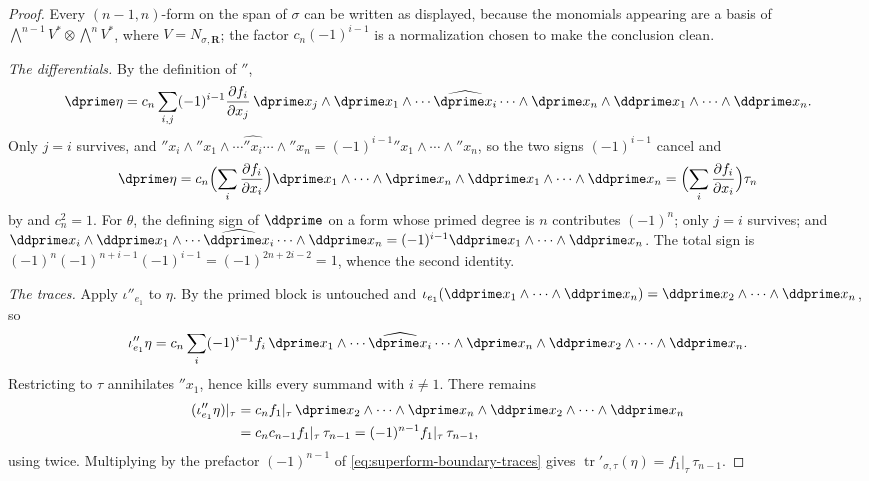 \begin{proof}
Every $(n-1,n)$-form on the span of $\sigma$ can be written as displayed,
because the monomials appearing are a basis of
$\bigwedge^{n-1}V^*\otimes\bigwedge^nV^*$, where
$V=N_{\sigma,\mathbf R}$; the factor
$c_n(-1)^{i-1}$ is a normalization chosen to make the conclusion clean.

\emph{The differentials.}  By the definition of $\dprime$,
\[
 \dprime\eta
 =c_n\sum_{i,j}(-1)^{i-1}\frac{\partial f_i}{\partial x_j}\,
   \dprime x_j\wedge\dprime x_1\wedge\cdots\widehat{\dprime x_i}\cdots
   \wedge\dprime x_n\wedge\ddprime x_1\wedge\cdots\wedge\ddprime x_n .
\]
Only $j=i$ survives, and
$\dprime x_i\wedge\dprime x_1\wedge\cdots\widehat{\dprime x_i}\cdots
\wedge\dprime x_n=(-1)^{i-1}\dprime x_1\wedge\cdots\wedge\dprime x_n$, so
the two signs $(-1)^{i-1}$ cancel and
\[
 \dprime\eta=c_n\Bigl(\sum_i\frac{\partial f_i}{\partial x_i}\Bigr)
  \dprime x_1\wedge\cdots\wedge\dprime x_n
   \wedge\ddprime x_1\wedge\cdots\wedge\ddprime x_n
  =\Bigl(\sum_i\frac{\partial f_i}{\partial x_i}\Bigr)\tau_n
\]
by  and $c_n^2=1$.  For $\theta$, the
defining sign of $\ddprime$ on a form whose primed degree is $n$ contributes
$(-1)^n$; only $j=i$ survives; and
$\ddprime x_i\wedge\ddprime x_1\wedge\cdots\widehat{\ddprime x_i}\cdots
\wedge\ddprime x_n=(-1)^{i-1}\ddprime x_1\wedge\cdots\wedge\ddprime x_n$.
The total sign is
$(-1)^n(-1)^{n+i-1}(-1)^{i-1}=(-1)^{2n+2i-2}=1$, whence the second identity.

\emph{The traces.}  Apply $\iota''_{e_1}$ to $\eta$.  By
 the primed block is untouched and
$\iota_{e_1}(\ddprime x_1\wedge\cdots\wedge\ddprime x_n)
=\ddprime x_2\wedge\cdots\wedge\ddprime x_n$, so
\[
 \iota''_{e_1}\eta
 =c_n\sum_i(-1)^{i-1}f_i\,
   \dprime x_1\wedge\cdots\widehat{\dprime x_i}\cdots\wedge\dprime x_n
   \wedge\ddprime x_2\wedge\cdots\wedge\ddprime x_n .
\]
Restricting to $\tau$ annihilates $\dprime x_1$, hence kills every summand
with $i\ne1$.  There remains
\[
 \begin{aligned}
 (\iota''_{e_1}\eta)|_\tau
 &=c_nf_1|_\tau\,
   \dprime x_2\wedge\cdots\wedge\dprime x_n
   \wedge\ddprime x_2\wedge\cdots\wedge\ddprime x_n\\
 &=c_nc_{n-1}f_1|_\tau\,\tau_{n-1}
  =(-1)^{n-1}f_1|_\tau\,\tau_{n-1},
 \end{aligned}
\]
using  twice.  Multiplying by the
prefactor $(-1)^{n-1}$ of \eqref{eq:superform-boundary-traces} gives
$\operatorname{tr}'_{\sigma,\tau}(\eta)=f_1|_\tau\,\tau_{n-1}$.


\end{proof}
